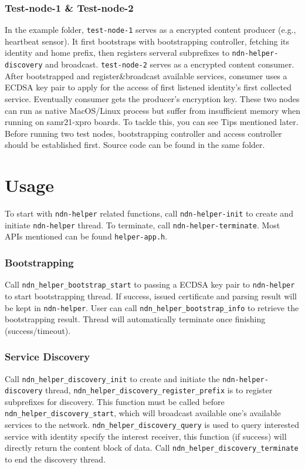 \documentclass[a4paper, 11pt]{article}
\begin{document}
        \subsubsection*{Test-node-1 \& Test-node-2}
        In the example folder, \texttt{test-node-1} serves as a encrypted content producer (e.g., heartbeat sensor). It first bootstraps with bootstrapping controller, fetching its identity and home prefix, then registers serveral subprefixes to \texttt{ndn-helper-discovery} and broadcast. 
        \texttt{test-node-2} serves as a encrypted content consumer. After bootstrapped and register\&broadcast available services, consumer uses a ECDSA key pair to apply for the access of first listened identity's first collected service. Eventually consumer gets the producer's encryption key. These two nodes can run as native MacOS/Linux process but suffer from insufficient memory when running on samr21-xpro boards. To tackle this, you can see Tips mentioned later. Before running two test nodes, bootstrapping controller and access controller 
        should be established first. Source code can be found in the same folder.

        \section*{Usage}
        To start with \texttt{ndn-helper} related functions, call \texttt{ndn-helper-init} to create and initiate \texttt{ndn-helper} thread. To terminate, call \texttt{ndn-helper-terminate}. Most APIs mentioned can be found \texttt{helper-app.h}.
        
        \subsubsection*{Bootstrapping}
        Call \texttt{ndn\_helper\_bootstrap\_start} to passing a ECDSA key pair to \texttt{ndn-helper} to start bootstrapping thread. If success, issued certificate and parsing result will be kept in \texttt{ndn-helper}. User can call \texttt{ndn\_helper\_bootstrap\_info} to retrieve the bootstrapping result. Thread will automatically terminate once finishing (success/timeout).
    
        \subsubsection*{Service Discovery}
        Call \texttt{ndn\_helper\_discovery\_init} to create and initiate the \texttt{ndn-helper-discovery} thread, \texttt{ndn\_helper\_discovery\_register\_prefix} is to register subprefixes for discovery. This function must be called before \texttt{ndn\_helper\_discovery\_start}, which will broadcast available one's available services to the network. \texttt{ndn\_helper\_discovery\_query} is used to query interested service with identity specify the interest receiver, this function (if success) will directly return the content block of data. Call \texttt{ndn\_helper\_discovery\_terminate}
        to end the discovery thread.
        
\end{document}
